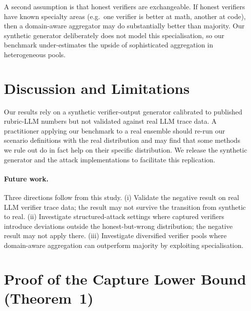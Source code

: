 \documentclass[11pt]{article}
\begin{document}
A second assumption is that honest verifiers are exchangeable. If
honest verifiers have known specialty areas (e.g.\ one verifier is
better at math, another at code), then a domain-aware aggregator may
do substantially better than majority. Our synthetic generator
deliberately does not model this specialisation, so our benchmark
under-estimates the upside of sophisticated aggregation in
heterogeneous pools.

\section{Discussion and Limitations}
Our results rely on a synthetic verifier-output generator calibrated
to published rubric-LLM numbers but not validated against
real LLM trace data. A practitioner applying our benchmark to a real
ensemble should re-run our scenario definitions with the real
distribution and may find that some methods we rule out do in fact
help on their specific distribution. We release the synthetic
generator and the attack implementations to facilitate this
replication.

\paragraph{Future work.}
Three directions follow from this study.
(i) Validate the negative result on real LLM verifier trace data;
the result may not survive the transition from synthetic to real.
(ii) Investigate structured-attack settings where captured verifiers
introduce deviations outside the honest-but-wrong distribution; the
negative result may not apply there.
(iii) Investigate diversified verifier pools where domain-aware
aggregation can outperform majority by exploiting specialisation.




\appendix

\section{Proof of the Capture Lower Bound (Theorem~1)}
\label{app:proof}
\end{document}
